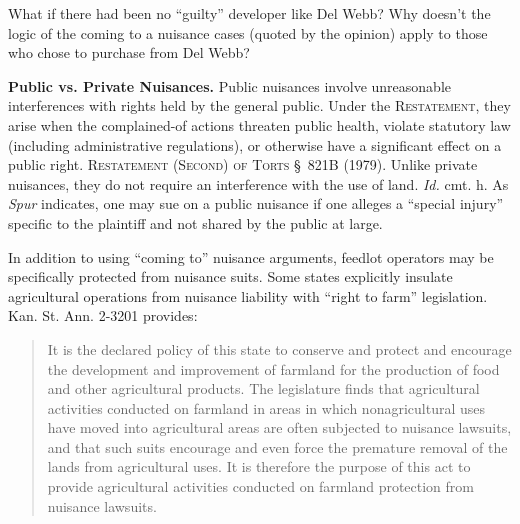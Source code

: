 
\item What if there had been no ``guilty'' developer like Del Webb? Why doesn't
the logic of the coming to a nuisance cases (quoted by the opinion) apply to
those who chose to purchase from Del Webb?

\item \textbf{Public vs. Private Nuisances.} Public nuisances involve
unreasonable interferences with rights held by the general public. Under the
\textsc{Restatement}, they arise when the complained-of actions threaten public
health, violate statutory law (including administrative regulations), or
otherwise have a significant effect on a public right. \textsc{Restatement
(Second) of Torts} \S~821B (1979). Unlike private nuisances, they do not require
an interference with the use of land. \textit{Id.} cmt. h. As \textit{Spur}
indicates, one may sue on a public nuisance if one alleges a ``special injury''
specific to the plaintiff and not shared by the public at large.

\item In addition to using ``coming to'' nuisance arguments, feedlot operators
may be specifically protected from nuisance suits. Some states explicitly
insulate agricultural operations from nuisance liability with ``right to farm''
legislation. Kan. St. Ann. 2-3201 provides:
\begin{quote}
It is the declared policy of this state to conserve and protect and encourage
the development and improvement of farmland for the production of food and other
agricultural products. The legislature finds that agricultural activities
conducted on farmland in areas in which nonagricultural uses have moved into
agricultural areas are often subjected to nuisance lawsuits, and that such suits
encourage and even force the premature removal of the lands from agricultural
uses. It is therefore the purpose of this act to provide agricultural activities
conducted on farmland protection from nuisance lawsuits.
\end{quote}
